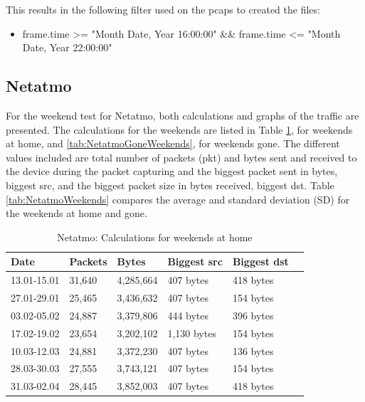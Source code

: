This results in the following filter used on the pcaps to created the files: 

\begin{itemize}
    \item frame.time >= "Month Date, Year 16:00:00" \&\& frame.time <= "Month Date, Year 22:00:00"
\end{itemize}

\newpage
\subsection{Netatmo}
For the weekend test for Netatmo, both calculations and graphs of the traffic are presented. The calculations for the weekends are listed in Table \ref{tab:NetatmoHomeWeekends}, for weekends at home, and \ref{tab:NetatmoGoneWeekends}, for weekends gone. The different values included are total number of packets (pkt) and bytes sent and received to the device during the packet capturing and the biggest packet sent in bytes, biggest src, and the biggest packet size in bytes received, biggest dst. Table \ref{tab:NetatmoWeekends} compares the average and standard deviation (SD) for the weekends at home and gone. 

\begin{table}[H]
    \centering
    \caption{Netatmo: Calculations for weekends at home}
    \begin{tabular}{|l|l|l|l|l|l|}
    \hline
        \textbf{Date} & \textbf{Packets} & \textbf{Bytes}  & \textbf{Biggest src} & \textbf{Biggest dst} \\ \hline
        13.01-15.01   & 31,640           & 4,285,664       & 407 bytes            & 418 bytes            \\ \hline
        27.01-29.01   & 25,465           & 3,436,632       & 407 bytes            & 154 bytes            \\ \hline
        03.02-05.02   & 24,887           & 3,379,806       & 444 bytes            & 396 bytes            \\ \hline
        17.02-19.02   & 23,654           & 3,202,102       & 1,130 bytes          & 154 bytes            \\ \hline
        10.03-12.03   & 24,881           & 3,372,230       & 407 bytes            & 136 bytes            \\ \hline
        28.03-30.03   & 27,555           & 3,743,121       & 407 bytes            & 154 bytes            \\ \hline
        31.03-02.04   & 28,445           & 3,852,003       & 407 bytes            & 418 bytes            \\ \hline
    \end{tabular}
    \label{tab:NetatmoHomeWeekends}
\end{table}

